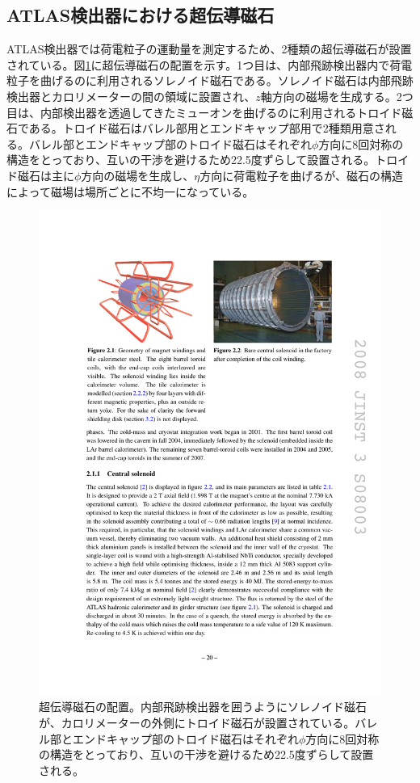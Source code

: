 \subsection{ATLAS検出器における超伝導磁石}
\label{subsec_magnet}
ATLAS検出器では荷電粒子の運動量を測定するため、2種類の超伝導磁石が設置されている。図\ref{ATLASmagnet}に超伝導磁石の配置を示す。1つ目は、内部飛跡検出器内で荷電粒子を曲げるのに利用されるソレノイド磁石である。ソレノイド磁石は内部飛跡検出器とカロリメーターの間の領域に設置され、$z$軸方向の磁場を生成する。2つ目は、内部検出器を透過してきたミューオンを曲げるのに利用されるトロイド磁石である。トロイド磁石はバレル部用とエンドキャップ部用で2種類用意される。バレル部とエンドキャップ部のトロイド磁石はそれぞれ$\phi$方向に8回対称の構造をとっており、互いの干渉を避けるため22.5度ずらして設置される。トロイド磁石は主に$\phi$方向の磁場を生成し、$\eta$方向に荷電粒子を曲げるが、磁石の構造によって磁場は場所ごとに不均一になっている。

\begin{figure} 
    \centering
    \includegraphics[width=12cm]{fig/Intro/ATLASmagnet.pdf}
    \caption[超伝導磁石の配置]{超伝導磁石の配置\cite{JINST:2008}。内部飛跡検出器を囲うようにソレノイド磁石が、カロリメーターの外側にトロイド磁石が設置されている。バレル部とエンドキャップ部のトロイド磁石はそれぞれ$\phi$方向に8回対称の構造をとっており、互いの干渉を避けるため22.5度ずらして設置される。}
    \label{ATLASmagnet}
\end{figure}

